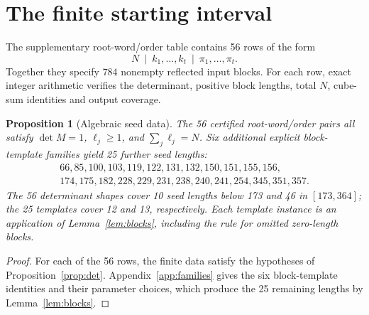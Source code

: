 \documentclass[9pt]{extarticle}
\newtheorem{proposition}[theorem]{Proposition}
\begin{document}
\section{The finite starting interval}\label{sec:finite}
The supplementary root-word/order table contains 56 rows of the form
\[
N\ \mid\ k_1,\ldots,k_t\ \mid\ \pi_1,\ldots,\pi_t.
\]
Together they specify $784$ nonempty reflected input blocks. For each row,
exact integer arithmetic verifies the determinant, positive block lengths,
total $N$, cube-sum identities and output coverage.

\begin{proposition}[Algebraic seed data]\label{prop:finite}
The 56 certified root-word/order pairs all satisfy $\det M=1$, $\ell_j\ge1$, and $\sum_j\ell_j=N$. Six additional explicit block-template families yield 25 further seed lengths:
\begin{multline*}
66,85,100,103,119,122,131,132,150,151,155,156,\\
174,175,182,228,229,231,238,240,241,254,345,351,357.
\end{multline*}
The 56 determinant shapes cover 10 seed lengths below 173 and 46 in $[173,364]$; the 25 templates cover 12 and 13, respectively. Each template instance is an application of Lemma~\ref{lem:blocks}, including the rule for omitted zero-length blocks.
\end{proposition}
\begin{proof}
For each of the 56 rows, the finite data satisfy the hypotheses of
Proposition~\ref{prop:det}. Appendix~\ref{app:families} gives the six
block-template identities and their parameter choices, which produce the
25 remaining lengths by Lemma~\ref{lem:blocks}.
\end{proof}
\end{document}
